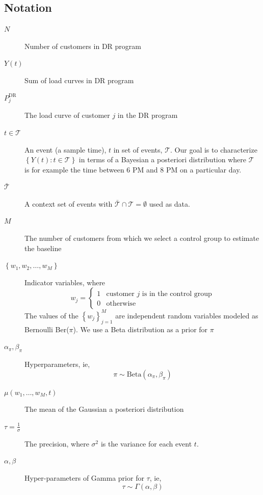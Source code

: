\documentclass[journal]{IEEEtran}
\newcommand{\eventset}{\mathcal{T}}
\newcommand{\context}{\bar {\mathcal{T}}}
\begin{document}
\subsection{Notation}
\label{sec:notation}
\begin{description}
\item[$N$] Number of customers in DR program
\item[$Y(t)$] Sum of load curves in DR program
\item[$P_j^{\text{DR}}$] The load curve of customer $j$ in the DR
  program
\item[$t\in \eventset$] An event (a sample time), $t$ in set of
  events, $\eventset$.  Our goal is to characterize $\left\{ Y(t) : t
    \in \eventset \right\}$ in terms of a Bayesian a posteriori
  distribution where $\eventset$ is for example the time between 6 PM
  and 8 PM on a particular day.
\item[$\context$] A context set of events with $\context \cap
  \eventset = \emptyset$ used as data.
\item[$M$] The number of customers from which we select a control
  group to estimate the baseline
\item[$\left\{ w_1, w_2, \ldots, w_M \right\}$] Indicator variables,
  where
  \begin{equation*}
    w_j =
    \begin{cases}
      1 & \text{customer } j \text{ is in the control group}\\
      0 & \text{otherwise}
    \end{cases}
  \end{equation*}
  The values of the $\left\{ w_j \right\}_{j=1}^M$ are independent
  random variables modeled as Bernoulli Ber($\pi$).  We use a Beta
  distribution as a prior for $\pi$
\item [$\alpha_\pi, \beta_\pi$] Hyperparameters, ie,
  \begin{equation*}
    \pi \sim \text{Beta}(\alpha_\pi, \beta_\pi )
  \end{equation*}
\item[$\mu(w_1, \ldots, w_M, t )$]  The mean of the Gaussian a
  posteriori distribution
\item[$\tau = \frac{1}{\sigma}$] The precision, where $\sigma^2$ is
  the variance for each event $t$.
\item[$\alpha, \beta$] Hyper-parameters of Gamma prior for $\tau$, ie,
  \begin{equation*}
    \tau \sim \Gamma(\alpha, \beta)
  \end{equation*}


\end{description}
\end{document}
